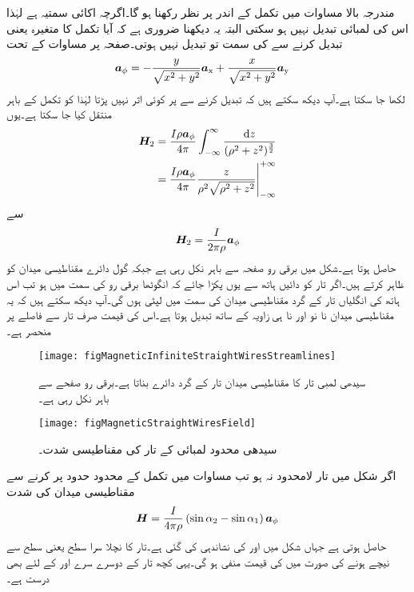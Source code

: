 مندرجہ بالا مساوات میں تکمل کے اندر  پر نظر رکھنا ہو گا۔اگرچہ  اکائی سمتیہ ہے لہٰذا اس کی لمبائی تبدیل نہیں ہو سکتی البتہ یہ دیکھنا ضروری ہے کہ آیا تکمل کا متغیرہ یعنی  تبدیل کرنے سے  کی سمت تو تبدیل نہیں ہوتی۔صفحہ  پر مساوات  کے تحت
\begin{align*}
{\boldsymbol{a}}_{\phi}&=-\frac{y}{\sqrt{x^2+y^2}} {\boldsymbol{a}}_{\textup{x}}+\frac{x}{\sqrt{x^2+y^2}} {\boldsymbol{a}}_{\textup{y}}
\end{align*}
لکھا جا سکتا ہے۔آپ دیکھ سکتے ہیں کہ  تبدیل کرنے سے  پر کوئی اثر نہیں پڑتا لہٰذا  کو تکمل کے باہر منتقل کیا جا سکتا ہے۔یوں
\begin{gather}
\begin{aligned}\label{مساوات_مقناطیسی_سیدھی_لامحدود_تار_کا_میدان}
\kvec{H}_2&=\frac{I \rho\aphi}{4\pi}\int_{-\infty}^{\infty} \frac{\dif z }{(\rho^2+z^2)^{\frac{3}{2}}}\\
&=\eval{\frac{I \rho \aphi}{4\pi} \frac{z}{\rho^2 \sqrt{\rho^2+z^2}}}_{-\infty}^{+\infty}
\end{aligned}
\end{gather}    
سے
\begin{align}
{\ensuremath{{\boldsymbol{H}}}}_2=\frac{I}{2\pi \rho} {\boldsymbol{a}}_{\phi}
\end{align}
حاصل ہوتا ہے۔شکل  میں برقی رو صفحہ سے باہر نکل رہی ہے جبکہ گول دائرے مقناطیسی میدان کو ظاہر کرتے ہیں۔اگر تار کو دائیں ہاتھ سے یوں پکڑا جائے کہ انگوٹھا برقی رو کی سمت میں ہو تب اس ہاتھ کی انگلیاں تار کے گرد مقناطیسی میدان کی سمت میں لپٹی ہوں گی۔آپ دیکھ سکتے ہیں کہ یہ مقناطیسی میدان نا نو  اور نا ہی زاویہ  کے ساتھ تبدیل ہوتا ہے۔اس کی قیمت صرف تار سے فاصلے پر منحصر ہے۔
\begin{figure}
\centering
\texttt{[image: figMagneticInfiniteStraightWiresStreamlines]}
\caption{سیدھی لمبی تار کا مقناطیسی میدان تار کے گرد دائرے بناتا ہے۔برقی رو صفحے سے باہر نکل رہی ہے۔}
\label{شکل_مقناطیسی_سیدھے_تار_کا_میدان_دائرے}
\end{figure}
%
\begin{figure}
\centering
\texttt{[image: figMagneticStraightWiresField]}
\caption{سیدھی  محدود لمبائی کے تار کی مقناطیسی شدت۔}
\label{شکل_مقناطیسی_سیدھے_محدود_تار_کا_میدان}
\end{figure}

اگر شکل  میں تار لامحدود نہ ہو تب مساوات  میں تکمل کے محدود حدود پر کرنے سے مقناطیسی میدان کی شدت
\begin{align}\label{مساوات_مقناطیسی_محدود_تار_کی_مقناطیس}
{\ensuremath{{\boldsymbol{H}}}}=\frac{I}{4\pi \rho} \left(\sin \alpha_2-\sin \alpha_1 \right) {\boldsymbol{a}}_{\phi}
\end{align}
حاصل ہوتی ہے جہاں شکل  میں  اور  کی نشاندہی کی گئی ہے۔تار کا نچلا سرا  سطح یعنی  سطح سے نیچے ہونے کی صورت میں  کی قیمت منفی ہو گی۔یہی کچھ تار کے دوسرے سرے اور  کے لئے بھی درست ہے۔

